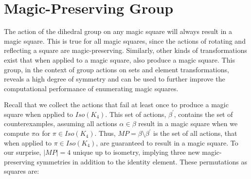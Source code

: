 \documentclass[12pt]{report}
\begin{document}
\section{Magic-Preserving Group}

\par The action of the dihedral group on any magic square will always result in a magic square.
This is true for all magic squares, since the actions of rotating and reflecting a square are
magic-preserving. Similarly, other kinds of transformations exist that when applied to a magic
square, also produce a magic square. This group, in the context of group actions on sets and
element transformations, reveals a high degree of symmetry and can be used to further improve the
computational performance of enumerating magic squares. \par Recall that we collect the actions
that fail at least once to produce a magic square when applied to $Iso(K_4)$. This set of actions,
${\beta}^\prime$, contains the set of counterexamples, assuming all actions $\alpha\in\beta$ result
in a magic square when we compute $\pi\alpha$ for $\pi\in Iso(K_4)$. Thus,
$MP=\beta\setminus{\beta}^\prime$ is the set of all actions, that when applied to $\pi\in
  Iso(K_4)$, are guaranteed to result in a magic square. To our surprise, $\left|MP\right|=4$
unique
up to isometry, implying three new magic-preserving symmetries in addition to the identity element.
These permutations as squares are:
\end{document}
